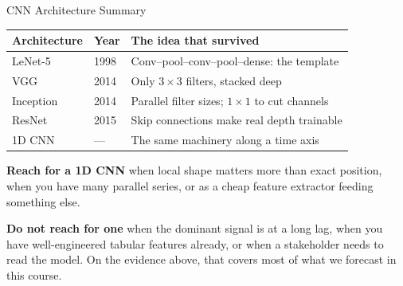 \documentclass[aspectratio=169, 11pt]{beamer}
\begin{document}
\begin{frame}{CNN Architecture Summary}
  \begin{center}
    {\small
    \begin{tabular}{llp{6.6cm}}
      \toprule
      \textbf{Architecture} & \textbf{Year} & \textbf{The idea that survived} \\
      \midrule
      LeNet-5 & 1998 & Conv--pool--conv--pool--dense: the template \\
      VGG & 2014 & Only $3\times3$ filters, stacked deep \\
      Inception & 2014 & Parallel filter sizes; $1\times1$ to cut channels \\
      ResNet & 2015 & Skip connections make real depth trainable \\
      1D CNN & --- & The same machinery along a time axis \\
      \bottomrule
    \end{tabular}
    }
  \end{center}
  \vspace{-0.2cm}

  \vspace{0.15cm}
  \textbf{Reach for a 1D CNN} when local shape matters more than exact position, when you have
  many parallel series, or as a cheap feature extractor feeding something else.

  \vspace{0.1cm}
  \textbf{Do not reach for one} when the dominant signal is at a long lag, when you have well-engineered
  tabular features already, or when a stakeholder needs to read the model. On the
  evidence above, that covers most of what we forecast in this course.
\end{frame}
\end{document}
